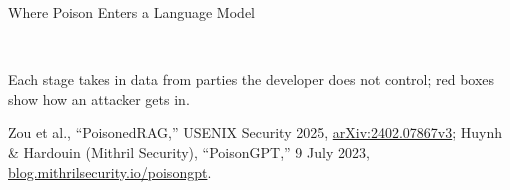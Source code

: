 \begin{frame}{Where Poison Enters a Language Model}
{{}\\[0.2em]
  {\scriptsize Each stage takes in data from parties the developer does not control; red boxes show how an attacker gets in.\par}\par}
  \vspace{0.1em}
  {\scriptsize Zou et al., ``PoisonedRAG,'' USENIX Security 2025, \href{https://arxiv.org/abs/2402.07867v3}{arXiv:2402.07867v3}; Huynh \& Hardouin (Mithril Security), ``PoisonGPT,'' 9 July 2023, \href{https://blog.mithrilsecurity.io/poisongpt-how-we-hid-a-lobotomized-llm-on-hugging-face-to-spread-fake-news/}{blog.mithrilsecurity.io/poisongpt}.\par}
\end{frame}

